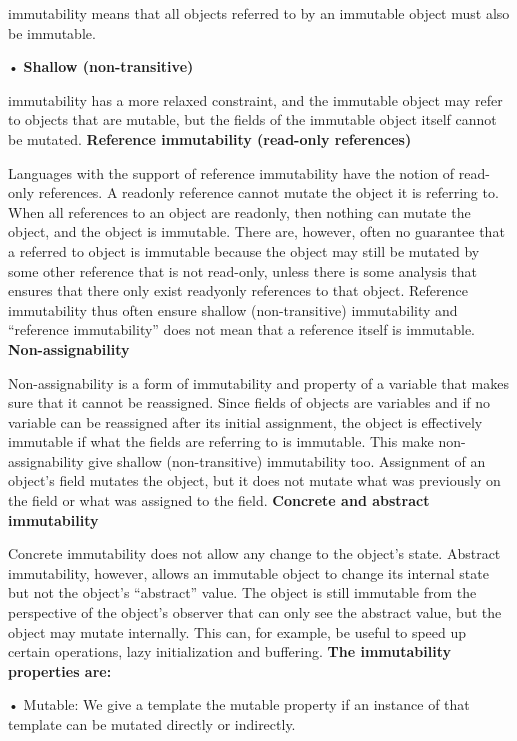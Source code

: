 \documentclass[conference]{IEEEtran}
\begin{document}
immutability means that all objects referred to by an immutable object must also be immutable.

• \textbf{Shallow (non-transitive)}

immutability has a more relaxed constraint, and the immutable object may refer to objects that are mutable, but the fields of the immutable object itself cannot be mutated.\newline
\textbf{Reference immutability (read-only references)}

Languages with the support of reference immutability have the notion of read-only references. A readonly
reference cannot mutate the object it is referring to. When all references to an object are readonly,
then nothing can mutate the object, and the object is immutable. There are, however, often no
guarantee that a referred to object is immutable because the object may still be mutated by some other
reference that is not read-only, unless there is some analysis that ensures that there only exist readyonly
references to that object. Reference immutability thus often ensure shallow (non-transitive)
immutability and “reference immutability” does not mean that a reference itself is immutable.\newline
\textbf{Non-assignability}

Non-assignability is a form of immutability and property of a variable that makes sure that it cannot
be reassigned. Since fields of objects are variables and if no variable can be reassigned after its initial
assignment, the object is effectively immutable if what the fields are referring to is immutable. This
make non-assignability give shallow (non-transitive) immutability too. Assignment of an object’s field
mutates the object, but it does not mutate what was previously on the field or what was assigned to the
field.\newline
\textbf{Concrete and abstract immutability}

Concrete immutability does not allow any change to the object’s state. Abstract immutability, however,
allows an immutable object to change its internal state but not the object’s “abstract” value. The object
is still immutable from the perspective of the object’s observer that can only see the abstract value, but
the object may mutate internally. This can, for example, be useful to speed up certain operations, lazy
initialization and buffering.\newline
\textbf{The immutability properties are:}

• Mutable: We give a template the mutable property if an instance of that template can be mutated
directly or indirectly.
\end{document}
